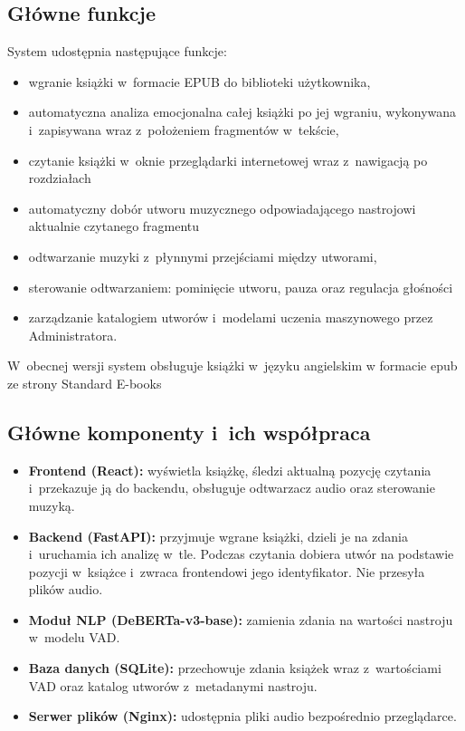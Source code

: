 \subsection{Główne funkcje}
System udostępnia następujące funkcje:
\begin{itemize}
    \item wgranie książki w~formacie EPUB do biblioteki użytkownika,
    \item automatyczna analiza emocjonalna całej książki po jej wgraniu,
          wykonywana i~zapisywana wraz z~położeniem fragmentów w~tekście,
    \item czytanie książki w~oknie przeglądarki internetowej wraz
          z~nawigacją po rozdziałach
    \item automatyczny dobór utworu muzycznego odpowiadającego nastrojowi
          aktualnie czytanego fragmentu
    \item odtwarzanie muzyki z~płynnymi przejściami między utworami,
    \item sterowanie odtwarzaniem: pominięcie utworu, pauza oraz regulacja
          głośności
    \item zarządzanie katalogiem utworów i~modelami uczenia maszynowego
          przez Administratora.
\end{itemize}
W~obecnej wersji system obsługuje książki w~języku angielskim w formacie epub ze strony
Standard E-books\cite{StandardEbooks}

\subsection{Główne komponenty i~ich współpraca}
\begin{itemize}
    \item \textbf{Frontend (React):} wyświetla książkę,
          śledzi aktualną pozycję czytania i~przekazuje ją do backendu,
          obsługuje odtwarzacz audio oraz sterowanie muzyką.
    \item \textbf{Backend (FastAPI):} przyjmuje wgrane książki, dzieli je
          na zdania i~uruchamia ich analizę w~tle. Podczas czytania
          dobiera utwór na podstawie pozycji w~książce i~zwraca
          frontendowi jego identyfikator. Nie przesyła plików audio.
    \item \textbf{Moduł NLP (DeBERTa-v3-base):} zamienia zdania na wartości
          nastroju w~modelu VAD.
    \item \textbf{Baza danych (SQLite):} przechowuje zdania książek wraz
          z~wartościami VAD oraz katalog utworów z~metadanymi nastroju.
    \item \textbf{Serwer plików (Nginx):} udostępnia pliki audio
          bezpośrednio przeglądarce.
\end{itemize}



